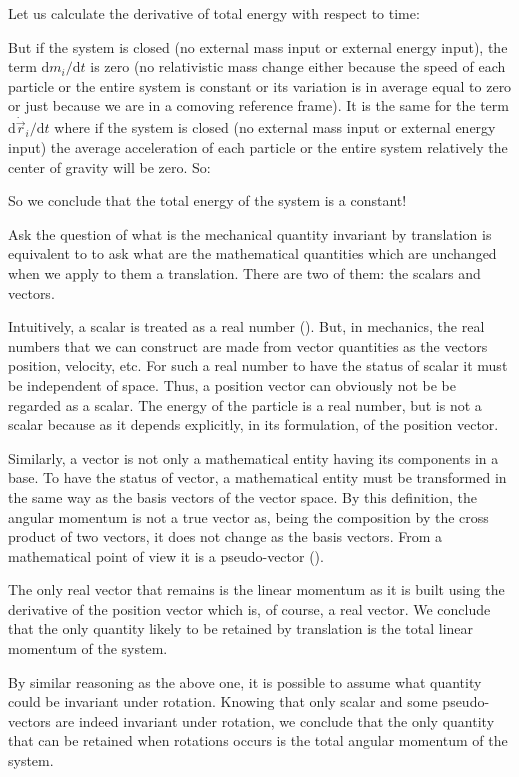  Let us calculate the derivative of total energy with respect to time:
	
	But if the system is closed (no external mass input or external energy input), the term $\mathrm{d}m_i/\mathrm{d}t$ is zero (no relativistic mass change either because the speed of each particle or the entire system is constant or its variation is in average equal to zero or just because we are in a comoving reference frame). It is the same for the term $\mathrm{d}\dot{\vec{r}}_i/\mathrm{d}t$ where if the system is closed  (no external mass input or external energy input) the average acceleration of each particle or the entire system relatively the center of gravity will be zero. So:
	
	So we conclude that the total energy of the system is a constant!

	Ask the question of what is the mechanical quantity invariant by translation is equivalent to to ask what are the mathematical quantities which are unchanged when we apply to them a translation. There are two of them: the scalars and vectors.

	Intuitively, a scalar is treated as a real number (). But, in mechanics, the real numbers that we can construct are made from vector quantities as the vectors position, velocity, etc. For such a real number to have the status of scalar it must be independent of space. Thus, a position vector can obviously not be be regarded as a scalar. The energy of the particle is a real number, but is not a scalar because as it depends explicitly, in its formulation, of the position vector.

	Similarly, a vector is not only a mathematical entity having its components in a base. To have the status of vector, a mathematical entity must be transformed in the same way as the basis vectors of the vector space. By this definition, the angular momentum is not a true vector as, being the composition by the cross product of two vectors, it does not change as the basis vectors. From a mathematical point of view it is a pseudo-vector ().

	The only real vector that remains is the linear momentum as it is built using the derivative of the position vector which is, of course, a real vector. We conclude that the only quantity likely to be retained by translation is the total linear momentum of the system.

	By similar reasoning as the above one, it is possible to assume what quantity could be invariant under rotation. Knowing that only scalar and some pseudo-vectors are indeed invariant under rotation, we conclude that the only quantity that can be retained when rotations occurs is the total angular momentum of the system.

